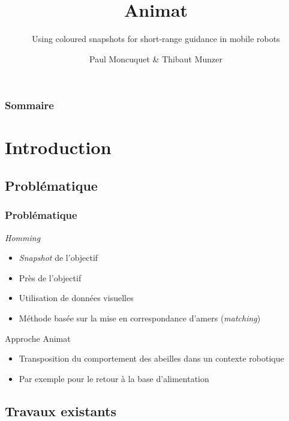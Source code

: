 \documentclass{beamer}
\title{Animat}
\subtitle{Using coloured snapshots for short-range guidance in mobile robots \cite{Gourichon2002}}
\author{Paul Moncuquet \& Thibaut Munzer}
\begin{document}
\begin{frame}
  \titlepage
\end{frame}

\begin{frame}
  \frametitle{Sommaire}
  \tableofcontents%
\end{frame}

\section{Introduction}

\subsection{Problématique}

\begin{frame}
  \frametitle{Problématique}
  \begin{block}{\textit{Homming}}
  \begin{itemize}
    \item \textit{Snapshot} de l'objectif
    \item Près de l'objectif
    \item Utilisation de données visuelles
    \item Méthode basée sur la mise en correspondance d'amers (\textit{matching})   
  \end{itemize}
  \end{block}

  \begin{block}{Approche Animat}
  \begin{itemize}
    \item Transposition du comportement des abeilles dans un contexte robotique
    \item Par exemple pour le retour à la base d'alimentation
  \end{itemize}
  \end{block}
\end{frame}

\subsection{Travaux existants}
\end{document}
